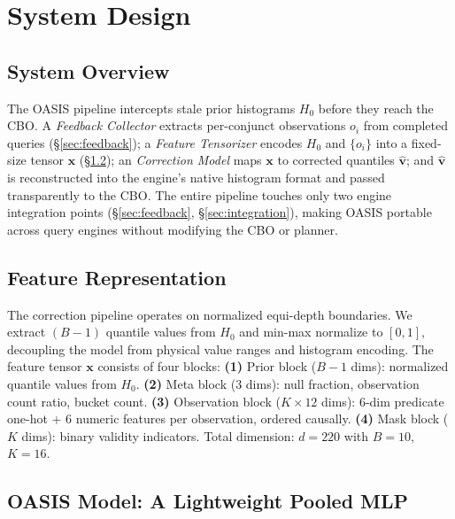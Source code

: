 \documentclass[runningheads]{llncs}
\begin{document}
\section{System Design}
\label{sec:design}
\subsection{System Overview}
The OASIS pipeline intercepts stale prior histograms $H_0$ before they reach the CBO.
A \emph{Feedback Collector} extracts per-conjunct observations $o_i$ from completed
queries (\S\ref{sec:feedback}); a \emph{Feature Tensorizer} encodes $H_0$ and
$\{o_i\}$ into a fixed-size tensor $\mathbf{x}$ (\S\ref{sec:tensor});
an \emph{Correction Model} maps $\mathbf{x}$ to corrected quantiles $\hat{\mathbf{v}}$;
and $\hat{\mathbf{v}}$ is reconstructed into the engine's native histogram format
and passed transparently to the CBO.
The entire pipeline touches only two engine integration points
(\S\ref{sec:feedback}, \S\ref{sec:integration}), making OASIS portable
across query engines without modifying the CBO or planner.

\subsection{Feature Representation}
\label{sec:tensor}
The correction pipeline operates on normalized equi-depth boundaries. We extract $(B{-}1)$ quantile values from $H_0$ and min-max normalize to $[0,1]$, decoupling the model from physical value ranges and histogram encoding.
The feature tensor $\mathbf{x}$ consists of four blocks:
\textbf{(1)} Prior block ($B{-}1$ dims): normalized quantile values from $H_0$.
\textbf{(2)} Meta block (3 dims): null fraction, observation count ratio, bucket count.
\textbf{(3)} Observation block ($K \times 12$ dims): 6-dim predicate one-hot + 6 numeric features per observation, ordered causally.
\textbf{(4)} Mask block ($K$ dims): binary validity indicators.
Total dimension: $d = 220$ with $B{=}10$, $K{=}16$.

\subsection{OASIS Model: A Lightweight Pooled MLP}
\label{sec:mlp}
\end{document}
